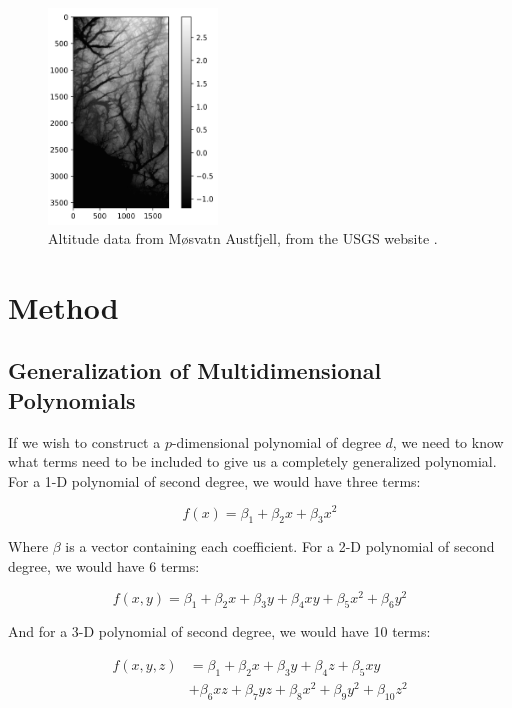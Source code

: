 \documentclass[a4paper,10pt,english]{article}
\begin{document}
\begin{figure}[H]
	\centering
	\includegraphics[width = 0.4\textwidth, center]{real_data.png}
	\caption{Altitude data from Møsvatn Austfjell, from the USGS website \cite{earthexplorer}.\label{fig_austfjell}}
\end{figure}	

\section*{Method}

\subsection*{Generalization of Multidimensional Polynomials}

If we wish to construct a $p$-dimensional polynomial of degree $d$, we need to know what terms need to be included to give us a completely generalized polynomial.  For a 1-D polynomial of second degree, we would have three terms:

\begin{equation*}
f(x) = \beta_1 + \beta_2 x + \beta_3 x^2
\end{equation*}

Where $\beta$ is a vector containing each coefficient.	For a 2-D polynomial of second degree, we would have 6 terms:

\begin{equation*}
f(x,y) = \beta_1 + \beta_2 x + \beta_3 y + \beta_4 xy + \beta_5 x^2 + \beta_6 y^2
\end{equation*}

And for a 3-D polynomial of second degree, we would have 10 terms:

\begin{align*}
f(x,y,z) &= \beta_1 + \beta_2 x + \beta_3 y + \beta_4 z + \beta_5 xy \\ &+ \beta_6 xz + \beta_7 yz + \beta_8 x^2 + \beta_9 y^2 + \beta_{10} z^2
\end{align*}
\end{document}

